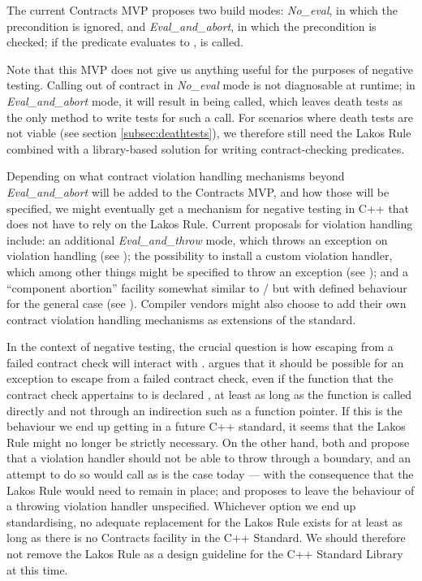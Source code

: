 The current Contracts MVP proposes two build modes: \emph{No_eval}, in which the precondition is ignored, and \emph{Eval_and_abort}, in which the precondition is checked; if the predicate evaluates to ,  is called.

Note that this MVP does not give us anything useful for the purposes of negative testing. Calling  out of contract in \emph{No_eval} mode is not diagnosable at runtime; in \mbox{\emph{Eval_and_abort}} mode, it will result in  being called, which leaves death tests as the only method to write tests for such a call. For scenarios where death tests are not viable (see section \ref{subsec:deathtests}), we therefore still need the Lakos Rule combined with a library-based solution for writing contract-checking predicates.

Depending on what contract violation handling mechanisms beyond \mbox{\emph{Eval_and_abort}} will be added to the Contracts MVP, and how those will be specified, we might eventually get a mechanism for negative testing in C++ that does not have to rely on the Lakos Rule. Current proposals for violation handling include: an additional \emph{Eval_and_throw} mode, which throws an exception on violation handling (see \cite{P2698R0}); the possibility to install a custom violation handler, which among other things might be specified to throw an exception (see \cite{P2811R2}); and a ``component abortion'' facility somewhat similar to / but with defined behaviour for the general case (see \cite{P2784R0}). Compiler vendors might also choose to add their own contract violation handling mechanisms as extensions of the standard.

In the context of negative testing, the crucial question is how escaping from a failed contract check will interact with . \cite{P2780R0} argues that it should be possible for an exception to escape from a failed contract check, even if the function that the contract check appertains to is declared , at least as long as the function is called directly and not through an indirection such as a function pointer. If this is the behaviour we end up getting in a future C++ standard, it seems that the Lakos Rule might no longer be strictly necessary. On the other hand, both \cite{P2811R2} and \cite{P2698R0} propose that a violation handler should not be able to throw through a  boundary, and an attempt to do so would call  as is the case today --- with the consequence that the Lakos Rule would need to remain in place; and \cite{P2852R0} proposes to leave the behaviour of a throwing violation handler unspecified. Whichever option we end up standardising, no adequate replacement for the Lakos Rule exists for at least as long as there is no Contracts facility in the C++ Standard. We should therefore not remove the Lakos Rule as a design guideline for the C++ Standard Library at this time.

